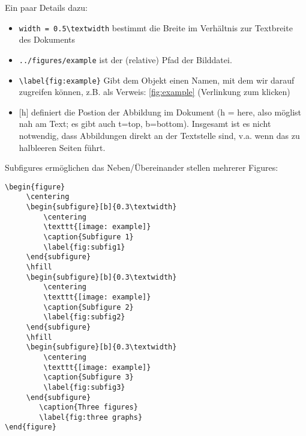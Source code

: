 \documentclass[twoside, 11pt, ngerman, a4paper, biblography=totoc]{article}
\begin{document}
Ein paar Details dazu:
\begin{itemize}
	\item \texttt{width = 0.5\textbackslash textwidth} bestimmt die Breite im Verhältnis zur Textbreite des Dokuments
	\item \texttt{../figures/example} ist der (relative) Pfad der Bilddatei. 
	\item \texttt{\textbackslash label\{fig:example\}} Gibt dem Objekt einen Namen, mit dem wir darauf zugreifen können, z.B. als Verweis: \cref{fig:example} (Verlinkung zum klicken)
	\item $[$h$]$ definiert die Postion der Abbildung im Dokument (h = here, also möglist nah am Text; es gibt auch t=top, b=bottom). Insgesamt ist es nicht notwendig, dass Abbildungen direkt an der Textstelle sind, v.a. wenn das zu halbleeren Seiten führt.
\end{itemize}

Subfigures ermöglichen das Neben/Übereinander stellen mehrerer Figures:

\begin{lstlisting}[language=Tex]
\begin{figure}
     \centering
     \begin{subfigure}[b]{0.3\textwidth}
         \centering
         \texttt{[image: example]}
         \caption{Subfigure 1}
         \label{fig:subfig1}
     \end{subfigure}
     \hfill
     \begin{subfigure}[b]{0.3\textwidth}
         \centering
         \texttt{[image: example]}
         \caption{Subfigure 2}
         \label{fig:subfig2}
     \end{subfigure}
     \hfill
     \begin{subfigure}[b]{0.3\textwidth}
         \centering
         \texttt{[image: example]}
         \caption{Subfigure 3}
         \label{fig:subfig3}
     \end{subfigure}
        \caption{Three figures}
        \label{fig:three graphs}
\end{figure}
\end{lstlisting}
\end{document}
